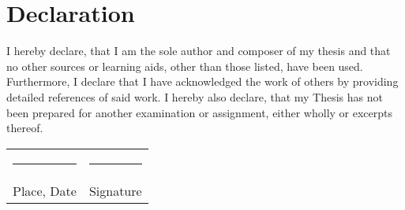 
\chapter*{Declaration}

I hereby declare, that I am the sole author and composer of my thesis and that no other sources or learning aids, other than those listed, have been used. Furthermore, I declare that I have acknowledged the work of others by providing detailed references of said work.  \newline
I hereby also declare, that my Thesis has not been prepared for another examination
or assignment, either wholly or excerpts thereof.
\\[3\normalbaselineskip]
\begin{tabular}{p{} l}
  \rule{\textwidth/3}{0.4pt}   &   \rule{\textwidth/3}{0.4pt} \\
  Place, Date                  &   Signature
\end{tabular}

